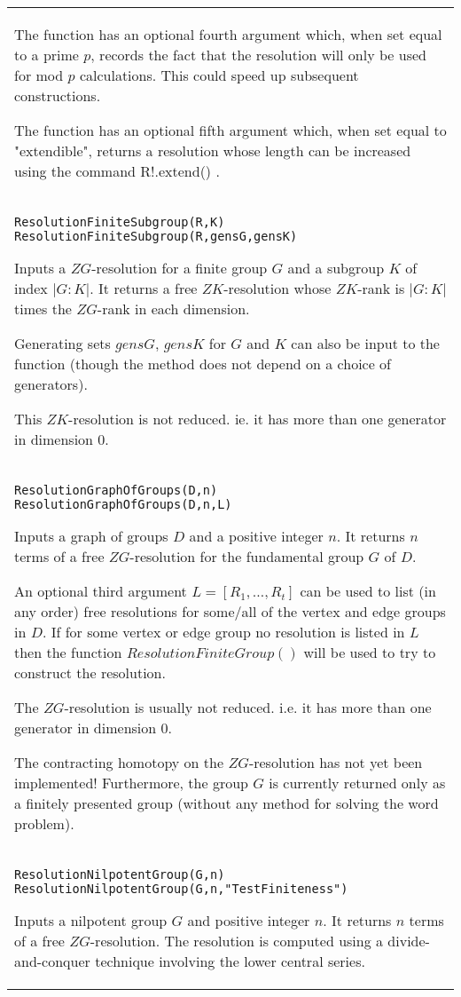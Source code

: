 \documentclass[a4paper,11pt]{report}
\begin{document}
{\begin{center}
\begin{tabular}{|l|}
 The function has an optional fourth argument which, when set equal to a prime $p$, records the fact that the resolution will only be used for mod $p$ calculations. This could speed up subsequent constructions. 

 The function has an optional fifth argument which, when set equal to
"extendible", returns a resolution whose length can be increased using the
command R!.extend() . \\
 \index{ResolutionFiniteSubgroup} \texttt{ResolutionFiniteSubgroup(R,K)} \texttt{ResolutionFiniteSubgroup(R,gensG,gensK)} 

 Inputs a $ZG$-resolution for a finite group $G$ and a subgroup $K$ of index $|G:K|$. It returns a free $ZK$-resolution whose $ZK$-rank is $|G:K|$ times the $ZG$-rank in each dimension.

 Generating sets $gensG$, $gensK$ for $G$ and $K$ can also be input to the function (though the method does not depend on a
choice of generators).

 This $ZK$-resolution is not reduced. ie. it has more than one generator in dimension $0$. \\
 \index{ResolutionGraphOfGroups} \texttt{ResolutionGraphOfGroups(D,n) } \texttt{ResolutionGraphOfGroups(D,n,L) } 

 Inputs a graph of groups $D$ and a positive integer $n$. It returns $n$ terms of a free $ZG$-resolution for the fundamental group $G$ of $D$.

 An optional third argument $L=[R_1 , \ldots , R_t]$ can be used to list (in any order) free resolutions for some/all of the vertex
and edge groups in $D$. If for some vertex or edge group no resolution is listed in $L$ then the function $ResolutionFiniteGroup()$ will be used to try to construct the resolution. 

 The $ZG$-resolution is usually not reduced. i.e. it has more than one generator in
dimension 0.

 The contracting homotopy on the $ZG$-resolution has not yet been implemented! Furthermore, the group $G$ is currently returned only as a finitely presented group (without any method
for solving the word problem). \\
 \index{ResolutionNilpotentGroup} \texttt{ResolutionNilpotentGroup(G,n) } \texttt{ResolutionNilpotentGroup(G,n,"TestFiniteness")} 

 Inputs a nilpotent group $G$ and positive integer $n$. It returns $n$ terms of a free $ZG$-resolution. The resolution is computed using a divide-and-conquer technique
involving the lower central series.


\end{tabular}
\end{center}}
\end{document}
